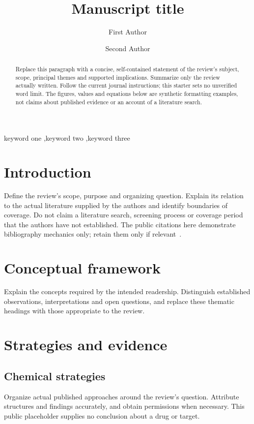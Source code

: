\documentclass[a4paper,preprint,12pt]{elsarticle}
\begin{document}
\begin{frontmatter}
\title{Manuscript title}
\author[inst1]{First Author}
\author[inst1,inst2]{Second Author\texorpdfstring{}{}}
\address[inst1]{Department, First Institution, City, Country}
\address[inst2]{Department, Second Institution, City, Country}

\begin{abstract}
Replace this paragraph with a concise, self-contained statement of the
review's subject, scope, principal themes and supported implications.
Summarize only the review actually written. Follow the current journal
instructions; this starter sets no unverified word limit. The figures,
values and equations below are synthetic formatting examples, not claims
about published evidence or an account of a literature search.
\end{abstract}
\begin{keyword}
keyword one \sep keyword two \sep keyword three
\end{keyword}
\end{frontmatter}

\section{Introduction}\label{sec:introduction}
Define the review's scope, purpose and organizing question. Explain its
relation to the actual literature supplied by the authors and identify
boundaries of coverage. Do not claim a literature search, screening process
or coverage period that the authors have not established. The public
citations here demonstrate bibliography mechanics only; retain them only
if relevant~\cite{wilkinson2016fair,peng2011reproducible}.

\section{Conceptual framework}\label{sec:framework}
Explain the concepts required by the intended readership. Distinguish
established observations, interpretations and open questions, and replace
these thematic headings with those appropriate to the review.

\section{Strategies and evidence}\label{sec:evidence}
\subsection{Chemical strategies}
Organize actual published approaches around the review's question. Attribute
structures and findings accurately, and obtain permissions when necessary.
This public placeholder supplies no conclusion about a drug or target.
\end{document}
